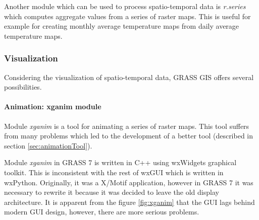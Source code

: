 \documentclass[a4paper,12pt,oneside]{book}
\newcommand{\module}[1]{\textsl{#1}}
\begin{document}
Another module which can be used to process spatio-temporal data is \module{r.series}
which computes aggregate values from a series of raster maps. This is useful for example
for creating monthly average temperature maps from daily average temperature maps.

\subsubsection{Visualization}
\label{sec:grassVisualization}
Considering the visualization of spatio-temporal data, GRASS GIS offers
several possibilities.

\paragraph{Animation: xganim module} Module \module{xganim} is a tool for animating a series of raster maps.
This tool suffers from many problems which led to the development
of a better tool (described in section \ref{sec:animationTool}).

Module \module{xganim} in GRASS 7 is written in C++ using wxWidgets graphical toolkit.
This is inconsistent with the rest of wxGUI which is written in wxPython.
Originally, it was a X/Motif application, however in GRASS 7 it was necessary
to rewrite it because it was decided to leave the old display architecture.
It is apparent from the figure \ref{fig:xganim} that the GUI lags behind modern GUI design,
however, there are more serious problems.
\end{document}

